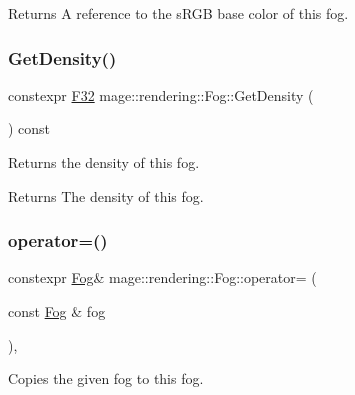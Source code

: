 \begin{DoxyReturn}{Returns}
A reference to the s\+R\+GB base color of this fog. 
\end{DoxyReturn}
\mbox{\label{classmage_1_1rendering_1_1_fog_ac99a5479a39027723807296c49fdfbc8}} 
\subsubsection{\texorpdfstring{Get\+Density()}{GetDensity()}}
{\footnotesize\ttfamily constexpr \mbox{\hyperlink{namespacemage_aa97e833b45f06d60a0a9c4fc22ae02c0}{F32}} mage\+::rendering\+::\+Fog\+::\+Get\+Density (\begin{DoxyParamCaption}{ }\end{DoxyParamCaption}) const\hspace{0.3cm}{\ttfamily [noexcept]}}

Returns the density of this fog.

\begin{DoxyReturn}{Returns}
The density of this fog. 
\end{DoxyReturn}
\mbox{\label{classmage_1_1rendering_1_1_fog_a6197ad3df06e461c7cb2f5028f8cd901}} 
\subsubsection{\texorpdfstring{operator=()}{operator=()}\hspace{0.1cm}{\footnotesize\ttfamily [1/2]}}
{\footnotesize\ttfamily constexpr \mbox{\hyperlink{classmage_1_1rendering_1_1_fog}{Fog}}\& mage\+::rendering\+::\+Fog\+::operator= (\begin{DoxyParamCaption}\item[{const \mbox{\hyperlink{classmage_1_1rendering_1_1_fog}{Fog}} \&}]{fog }\end{DoxyParamCaption})\hspace{0.3cm}{\ttfamily [default]}, {\ttfamily [noexcept]}}

Copies the given fog to this fog.


